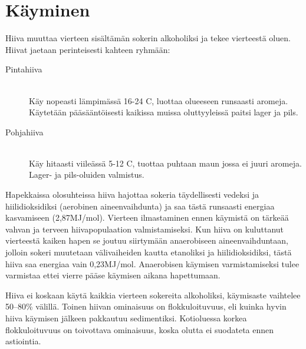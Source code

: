 \documentclass[a4paper,11pt]{report}
\begin{document}
\section{Käyminen}

Hiiva muuttaa vierteen sisältämän sokerin alkoholiksi ja tekee vierteestä oluen. Hiivat jaetaan perinteisesti kahteen ryhmään:
\begin{description}
\item[Pintahiiva] \hfill \\
Käy nopeasti lämpimässä 16-24 \degree C, luottaa olueeseen runsaasti aromeja. Käytetään pääsääntöisesti kaikissa muissa oluttyyleissä paitsi lager ja pils.
\item[Pohjahiiva] \hfill \\
Käy hitaasti viileässä 5-12 \degree C, tuottaa puhtaan maun jossa ei juuri aromeja. Lager- ja pils-oluiden valmistus.
\end{description}

Hapekkaissa olosuhteissa hiiva hajottaa sokeria täydellisesti vedeksi ja hiilidioksidiksi (aerobinen aineenvaihdunta) ja saa tästä runsaasti energiaa kasvamiseen (2,87MJ/mol). Vierteen ilmastaminen ennen käymistä on tärkeää vahvan ja terveen hiivapopulaation valmistamiseksi. Kun hiiva on kuluttanut vierteestä kaiken hapen se joutuu siirtymään anaerobiseen aineenvaihduntaan, jolloin sokeri muutetaan välivaiheiden kautta etanoliksi ja hiilidioksidiksi, tästä hiiva saa energiaa vain 0,23MJ/mol. Anaerobisen käymisen varmistamiseksi tulee varmistaa ettei vierre pääse käymisen aikana hapettumaan.

Hiiva ei koskaan käytä kaikkia vierteen sokereita alkoholiksi, käymisaste vaihtelee 50--80\% välillä. Toinen hiivan ominaisuus on flokkuloituvuus, eli kuinka hyvin hiiva käymisen jälkeen pakkautuu sedimentiksi. Kotioluessa korkea flokkuloituvuus on toivottava ominaisuus, koska olutta ei suodateta ennen astiointia.
\end{document}
